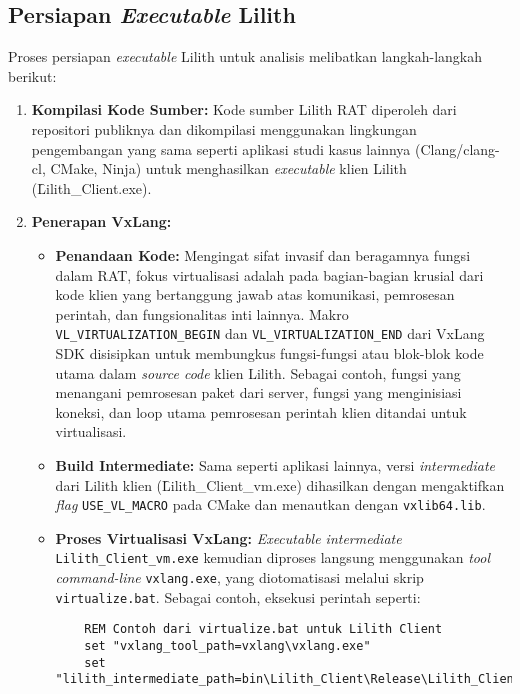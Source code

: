 \subsection{Persiapan \textit{Executable} Lilith}
Proses persiapan \textit{executable} Lilith untuk analisis melibatkan langkah-langkah berikut:
\begin{enumerate}
    \item \textbf{Kompilasi Kode Sumber:} Kode sumber Lilith RAT diperoleh dari repositori publiknya dan dikompilasi menggunakan lingkungan pengembangan yang sama seperti aplikasi studi kasus lainnya (Clang/clang-cl, CMake, Ninja) untuk menghasilkan \textit{executable} klien Lilith (\f{Lilith\_Client.exe}).
    \item \textbf{Penerapan VxLang:}
        \begin{itemize}
            \item \textbf{Penandaan Kode:} Mengingat sifat invasif dan beragamnya fungsi dalam RAT, fokus virtualisasi adalah pada bagian-bagian krusial dari kode klien yang bertanggung jawab atas komunikasi, pemrosesan perintah, dan fungsionalitas inti lainnya. Makro \texttt{VL\_VIRTUALIZATION\_BEGIN} dan \texttt{VL\_VIRTUALIZATION\_END} dari VxLang SDK disisipkan untuk membungkus fungsi-fungsi atau blok-blok kode utama dalam \textit{source code} klien Lilith. Sebagai contoh, fungsi yang menangani pemrosesan paket dari server, fungsi yang menginisiasi koneksi, dan loop utama pemrosesan perintah klien ditandai untuk virtualisasi.
            \item \textbf{Build Intermediate:} Sama seperti aplikasi lainnya, versi \textit{intermediate} dari Lilith klien (\f{Lilith\_Client\_vm.exe}) dihasilkan dengan mengaktifkan \textit{flag} \texttt{USE\_VL\_MACRO} pada CMake dan menautkan dengan \texttt{vxlib64.lib}.
            \item \textbf{Proses Virtualisasi VxLang:} \textit{Executable intermediate} \texttt{Lilith\_Client\_vm.exe} kemudian diproses langsung menggunakan \textit{tool command-line} \texttt{vxlang.exe}, yang diotomatisasi melalui skrip \texttt{virtualize.bat}. Sebagai contoh, eksekusi perintah seperti:
    \begin{listing}[H]
    \begin{verbatim}
    REM Contoh dari virtualize.bat untuk Lilith Client
    set "vxlang_tool_path=vxlang\vxlang.exe"
    set "lilith_intermediate_path=bin\Lilith_Client\Release\Lilith_Client_vm.exe"

\end{verbatim}
\end{listing}
\end{itemize}
\end{enumerate}
